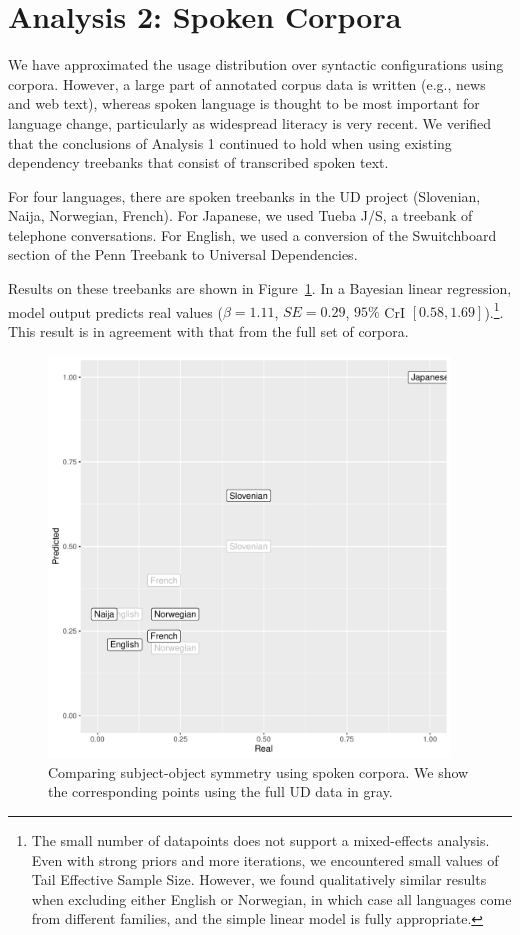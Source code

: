 \documentclass[11pt,a4paper]{article}
\begin{document}
\section{Analysis 2: Spoken Corpora}

We have approximated the usage distribution over syntactic configurations using corpora.
However, a large part of annotated corpus data is written (e.g., news and web text), whereas spoken language is thought to be most important for language change, particularly as widespread literacy is very recent.
We verified that the conclusions of Analysis 1 continued to hold when using existing dependency treebanks that consist of transcribed spoken text.

For four languages, there are spoken treebanks in the UD project (Slovenian, Naija, Norwegian, French).
For Japanese, we used Tueba J/S, a treebank of telephone conversations.
For English, we used a conversion of the Swuitchboard section of the Penn Treebank to Universal Dependencies.

Results on these treebanks are shown in Figure~\ref{fig:spoken}.
In a Bayesian linear regression, model output predicts real values ($\beta=1.11$, $SE=0.29$, $95\%$ CrI $[0.58, 1.69]$).\footnote{The small number of datapoints does not support a mixed-effects analysis. Even with strong priors and more iterations, we encountered small values of Tail Effective Sample Size. However, we found qualitatively similar results when excluding either English or Norwegian, in which case all languages come from different families, and the simple linear model is fully appropriate.}.
This result is in agreement with that from the full set of corpora.


\begin{figure}
    \centering
    \includegraphics[width=0.95\textwidth]{analysis_spoken/spoken.pdf}
    \caption{Comparing subject-object symmetry using spoken corpora. We show the corresponding points using the full UD data in gray.}
    \label{fig:spoken}
\end{figure}
\end{document}
